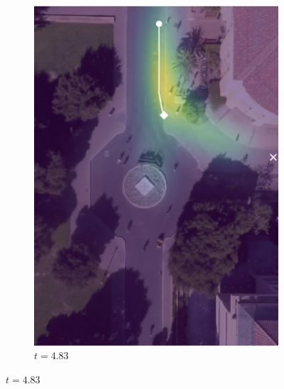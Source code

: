 \documentclass[letterpaper,10pt,conference]{ieeeconf}
\begin{document}
\begin{figure}
\begin{subfigure}[b]{.45\linewidth}
			\includegraphics[width=\linewidth]{./figures/FirstPage/gates_1_2_t=145.png}
			\caption{$t=4.83$}
		\end{subfigure}
	

\end{figure}
\end{document}
